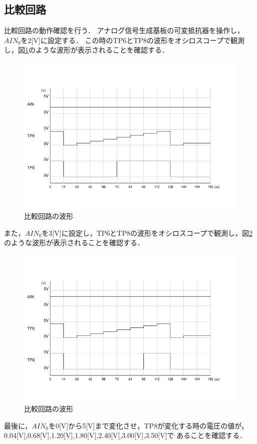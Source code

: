 \documentclass[a4paper,11pt,dvipdfmx]{jsarticle}
\begin{document}
\subsection{比較回路}
比較回路の動作確認を行う．
アナログ信号生成基板の可変抵抗器を操作し，$AIN_0$を2[V]に設定する．
この時のTP6とTP8の波形をオシロスコープで観測し，図\ref{fig:comparator}のような波形が表示されることを確認する．

\begin{figure}[H]
  \centering
  \includegraphics[width=0.8\linewidth]{./images/2V.png}
  \caption{比較回路の波形}
  \label{fig:comparator}
\end{figure}

また，$AIN_0$を3[V]に設定し，TP6とTP8の波形をオシロスコープで観測し，図\ref{fig:comparator2}のような波形が表示されることを確認する．

\begin{figure}[H]
  \centering
  \includegraphics[width=0.8\linewidth]{./images/3V.png}
  \caption{比較回路の波形}
  \label{fig:comparator2}
\end{figure}

最後に，$AIN_0$を0[V]から5[V]まで変化させ，TP8が変化する時の電圧の値が，0.04[V],0.68[V],1.20[V],1.80[V],2.40[V],3.00[V],3.50[V]で
あることを確認する．
\end{document}
